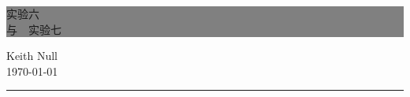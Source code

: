\begin{titlepage} %


    \colorbox{grey}{
        \parbox[t]{0.93\textwidth}{ %
            \parbox[t]{0.91\textwidth}{ %
                \raggedleft %
                \fontsize{50pt}{80pt}\selectfont %
                \vspace{0.7cm} %

                  实验六 \\
                  与\ \ 实验七 \\


                \vspace{0.7cm} %
            }
        }
    }

    \vfill %


    \parbox[t]{0.93\textwidth}{ %
        \raggedleft %
        \large %
        {\Large Keith Null}\\[4pt] %
        \today\\

        \hfill\rule{0.2\linewidth}{1pt}%
    }

\end{titlepage}



